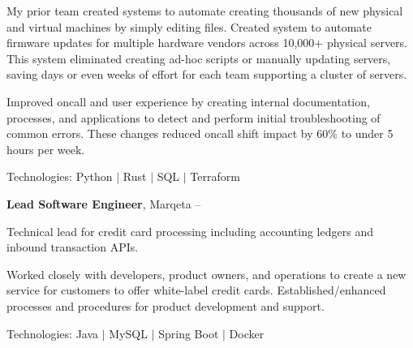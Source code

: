 \documentclass[letterpaper,MMMMyyyy,nonstopmode]{simpleresumecv}
\newcommand{\tech}[1]{\textrm{Technologies:} #1}
\newif\ifLOCATION
\begin{document}
\begin{Body}
\begin{Detail}
\Gap
My prior team created systems to automate creating thousands of new physical and virtual machines by simply editing files. 
\BulletItem
Created system to automate firmware updates for multiple hardware vendors across 10,000+ physical servers. 
This system eliminated creating ad-hoc scripts or manually updating servers, saving days or even weeks of effort for each team supporting a cluster of servers.

\BulletItem
Improved oncall and user experience by creating internal documentation, processes, and applications to detect and perform initial troubleshooting of common errors.
These changes reduced oncall shift impact by 60\% to under 5 hours per week.


\fi 		%

\tech{Python $|$ Rust $|$ SQL $|$ Terraform}

\end{Detail}

\BigGap

\Entry
\textbf{Lead Software Engineer}, Marqeta
\hfill
 -- 

\ifLOCATION
\hfill
Rochester, New York
\fi
\Gap
\begin{Detail}
Technical lead for credit card processing including accounting ledgers and inbound transaction APIs.

\Gap

\BulletItem
Worked closely with developers, product owners, and operations to create a new service for customers to offer white-label credit cards. 
\BulletItem
Established/enhanced processes and procedures for product development and support.

\tech{Java $|$ MySQL $|$ Spring Boot $|$ Docker}


\end{Detail}
\end{Body}
\end{document}
